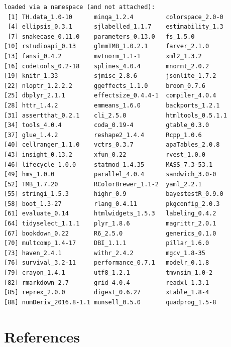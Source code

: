 \documentclass[
  english,
]{book}
\begin{document}
\begin{verbatim}
loaded via a namespace (and not attached):
 [1] TH.data_1.0-10      minqa_1.2.4         colorspace_2.0-0   
 [4] ellipsis_0.3.1      sjlabelled_1.1.7    estimability_1.3   
 [7] snakecase_0.11.0    parameters_0.13.0   fs_1.5.0           
[10] rstudioapi_0.13     glmmTMB_1.0.2.1     farver_2.1.0       
[13] fansi_0.4.2         mvtnorm_1.1-1       xml2_1.3.2         
[16] codetools_0.2-18    splines_4.0.4       mnormt_2.0.2       
[19] knitr_1.33          sjmisc_2.8.6        jsonlite_1.7.2     
[22] nloptr_1.2.2.2      ggeffects_1.1.0     broom_0.7.6        
[25] dbplyr_2.1.1        effectsize_0.4.4-1  compiler_4.0.4     
[28] httr_1.4.2          emmeans_1.6.0       backports_1.2.1    
[31] assertthat_0.2.1    cli_2.5.0           htmltools_0.5.1.1  
[34] tools_4.0.4         coda_0.19-4         gtable_0.3.0       
[37] glue_1.4.2          reshape2_1.4.4      Rcpp_1.0.6         
[40] cellranger_1.1.0    vctrs_0.3.7         apaTables_2.0.8    
[43] insight_0.13.2      xfun_0.22           rvest_1.0.0        
[46] lifecycle_1.0.0     statmod_1.4.35      MASS_7.3-53.1      
[49] hms_1.0.0           parallel_4.0.4      sandwich_3.0-0     
[52] TMB_1.7.20          RColorBrewer_1.1-2  yaml_2.2.1         
[55] stringi_1.5.3       highr_0.9           bayestestR_0.9.0   
[58] boot_1.3-27         rlang_0.4.11        pkgconfig_2.0.3    
[61] evaluate_0.14       htmlwidgets_1.5.3   labeling_0.4.2     
[64] tidyselect_1.1.1    plyr_1.8.6          magrittr_2.0.1     
[67] bookdown_0.22       R6_2.5.0            generics_0.1.0     
[70] multcomp_1.4-17     DBI_1.1.1           pillar_1.6.0       
[73] haven_2.4.1         withr_2.4.2         mgcv_1.8-35        
[76] survival_3.2-11     performance_0.7.1   modelr_0.1.8       
[79] crayon_1.4.1        utf8_1.2.1          tmvnsim_1.0-2      
[82] rmarkdown_2.7       grid_4.0.4          readxl_1.3.1       
[85] reprex_2.0.0        digest_0.6.27       xtable_1.8-4       
[88] numDeriv_2016.8-1.1 munsell_0.5.0       quadprog_1.5-8     
\end{verbatim}

\hypertarget{refs}{%
\chapter*{References}\label{refs}}

  
\end{document}

